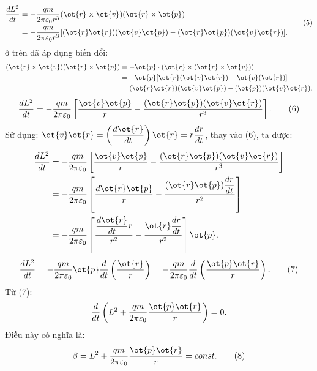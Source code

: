 \begin{loigiai}
\begin{enumerate}[1)]
\begin{enumerate}
            \[
            \begin{aligned}
                \dfrac{{d}{{{L}}^{2}}}{{dt}}&=-\dfrac{{qm}}{2\pi {{\varepsilon }_{0}}{{{r}}^{3}}}(\ot{{r}}\times \ot{{v}})(\ot{{r}}\times \ot{{p}})\\
                &=-\dfrac{{qm}}{2\pi {{\varepsilon }_{0}}{{{r}}^{3}}}[(\ot{{r}}\ot{{r}})(\ot{{v}}\ot{p})-(\ot{{r}}\ot{p})(\ot{{v}}\ot{{r}})]. 
            \end{aligned} \tag{5}\]
            ở trên đã áp dụng biến đổi: 
            \[\begin{aligned}
                (\ot{{r}}\times \ot{{v}})(\ot{{r}}\times \ot{{p}})&=-\ot{{p}}\cdot (\ot{{r}}\times (\ot{{r}}\times \ot{{v}}))\\
                &=-\ot{{p}}[\ot{{r}}(\ot{v}\ot{r})-\ot{{v}}(\ot{{r}})]\\
                &=(\ot{r}\ot{r})(\ot{v}\ot{p})-(\ot{{p}})(\ot{v}\ot{r}).
            \end{aligned}
            \]
            \[\dfrac{{d}{{{L}}^{2}}}{{dt}}=-\dfrac{{qm}}{2\pi {{\varepsilon }_{0}}}\left[ \dfrac{\ot{v}\ot{p}}{{r}}-\dfrac{(\ot{r}\ot{p})(\ot{v}\ot{r})}{{{{r}}^{3}}} \right]. \tag{6}\]
            Sử dụng: 
            $\ot{{v}}\ot{r}=\left( \dfrac{{d}\ot{{r}}}{{dt}} \right)\ot{{r}}={r}\dfrac{{dr}}{{dt}}$, thay vào (6), ta được:
            \[\begin{aligned}
              \dfrac{{d}{{{L}}^{2}}}{{dt}}&=-\dfrac{{qm}}{2\pi {{\varepsilon }_{0}}}\left[ \dfrac{\ot{{v}}\ot{p}}{{r}}-\dfrac{(\ot{{r}}\ot{p})(\ot{{v}}\ot{{r}})}{{{{r}}^{3}}} \right]\\
              &=-\dfrac{{qm}}{2\pi {{\varepsilon }_{0}}}\left[ \dfrac{{d}\ot{{r}}\ot{{p}}}{{r}}-\dfrac{(\ot{{r}}\ot{p})\dfrac{{dr}}{{dt}}}{{{{r}}^{2}}} \right]\\
              &=-\dfrac{{qm}}{2\pi {{\varepsilon }_{0}}}\left[ \dfrac{\dfrac{{d}\ot{{r}}}{{dt}}{r}}{{{{r}}^{2}}}-\dfrac{\ot{{r}}\dfrac{{dr}}{{dt}}}{{{{r}}^{2}}} \right]\ot{{p}}.
            \end{aligned}\]
            \[\dfrac{{d}{{{L}}^{2}}}{{dt}}=-\dfrac{{qm}}{2\pi {{\varepsilon }_{0}}}\ot{{p}}\dfrac{{d}}{{dt}}\left( \dfrac{\ot{{r}}}{{r}} \right)=-\dfrac{{qm}}{2\pi {{\varepsilon }_{0}}}\dfrac{{d}}{{dt}}\left( \dfrac{\ot{{p}}\ot{{r}}}{{r}} \right). \tag{7}\]
            Từ (7): 
            \[\dfrac{{d}}{{dt}}\left( {{{L}}^{2}}+\dfrac{{qm}}{2\pi {{\varepsilon }_{0}}}\dfrac{\ot{{p}}\ot{r}}{{r}} \right)=0.\] 
            Điều này có nghĩa là:  \[\beta ={{{L}}^{2}}+\dfrac{{qm}}{2\pi {{\varepsilon }_{0}}}\dfrac{\ot{{p}}\ot{r}}{{r}}={const}. \tag{8}\]

\end{enumerate}
\end{enumerate}
\end{loigiai}
